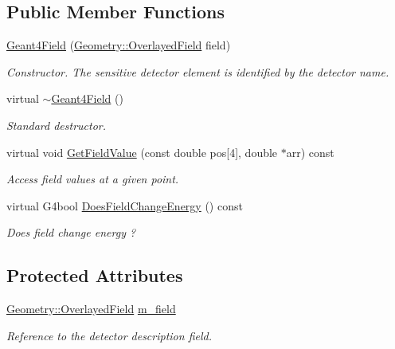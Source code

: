 \subsection*{Public Member Functions}
\begin{DoxyCompactItemize}
\item 
\hyperlink{class_d_d4hep_1_1_simulation_1_1_geant4_field_addb058e48762664448c2c1fdce1cc807}{Geant4Field} (\hyperlink{class_d_d4hep_1_1_geometry_1_1_overlayed_field}{Geometry::OverlayedField} field)
\begin{DoxyCompactList}\small\item\em Constructor. The sensitive detector element is identified by the detector name. \item\end{DoxyCompactList}\item 
virtual \hyperlink{class_d_d4hep_1_1_simulation_1_1_geant4_field_ac653a1246053747ac97c18dee3c8d9c2}{$\sim$Geant4Field} ()
\begin{DoxyCompactList}\small\item\em Standard destructor. \item\end{DoxyCompactList}\item 
virtual void \hyperlink{class_d_d4hep_1_1_simulation_1_1_geant4_field_a1b890e2957fb750d360c0c518f3af0d4}{GetFieldValue} (const double pos\mbox{[}4\mbox{]}, double $\ast$arr) const 
\begin{DoxyCompactList}\small\item\em Access field values at a given point. \item\end{DoxyCompactList}\item 
virtual G4bool \hyperlink{class_d_d4hep_1_1_simulation_1_1_geant4_field_a987ca37ab873ff5b2405e8f16c090786}{DoesFieldChangeEnergy} () const 
\begin{DoxyCompactList}\small\item\em Does field change energy ? \item\end{DoxyCompactList}\end{DoxyCompactItemize}
\subsection*{Protected Attributes}
\begin{DoxyCompactItemize}
\item 
\hyperlink{class_d_d4hep_1_1_geometry_1_1_overlayed_field}{Geometry::OverlayedField} \hyperlink{class_d_d4hep_1_1_simulation_1_1_geant4_field_a453c3e707d5f019ef541b449c80100ae}{m\_\-field}
\begin{DoxyCompactList}\small\item\em Reference to the detector description field. \item\end{DoxyCompactList}\end{DoxyCompactItemize}


